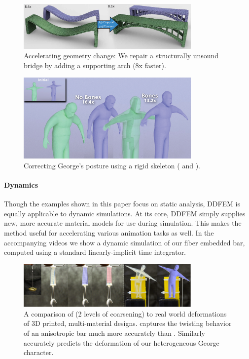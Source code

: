 \begin{figure}
	\centering
	\includegraphics[width=0.8\textwidth]{images/bridge.pdf}
	\caption{Accelerating geometry change: We repair a structurally unsound bridge by adding a supporting arch (8x faster).}
	\label{fig:bridge}
\end{figure}
\begin{figure}
	\centering
	\includegraphics[width=0.8\textwidth]{images/georgeUpdate.png}
	\caption{Correcting George's posture using a rigid skeleton ({\HiRes} and {\DDFEM}).}
	\label{fig:george}
\end{figure}
\paragraph{Dynamics} Though the examples shown in this paper focus on static analysis, DDFEM is equally applicable to dynamic simulations. At its core, DDFEM simply supplies new, more accurate material models for use during simulation. This makes the method useful for accelerating various animation tasks as well. In the accompanying videos we show a dynamic simulation of our fiber embedded bar, computed using a standard linearly-implicit time integrator.

\begin{figure}
	\centering
	\includegraphics[width=0.8\textwidth]{images/experiments.jpg}
	\caption{A comparison of  {\DDFEM} (2 levels of coarsening) to real world deformations of 3D printed, multi-material designs. {\DDFEM} captures the twisting behavior of an anisotropic bar much more accurately than {\Naive}. Similarly {\DDFEM} accurately predicts the deformation of our heterogeneous George character. }
	\label{fig:experiments}
\end{figure}

